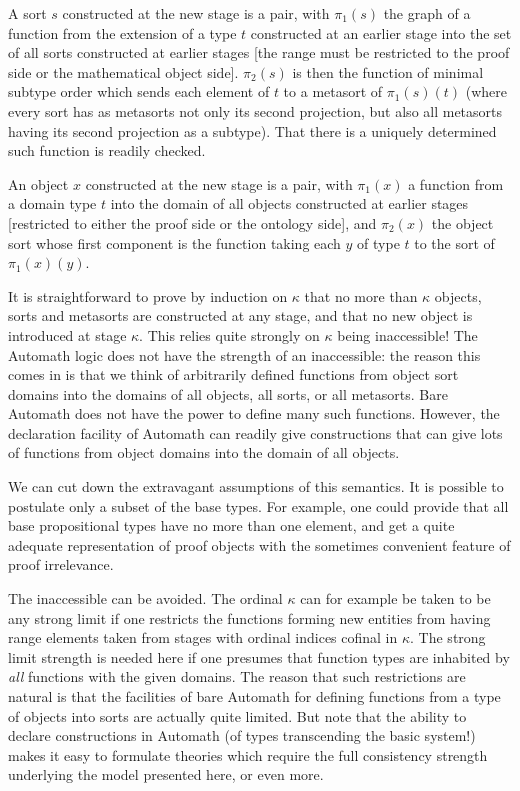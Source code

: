 \documentclass[12pt]{article}
\begin{document}
A sort $s$ constructed at the new stage is a pair, with $\pi_1(s)$ the graph of a function from the extension of a type $t$ constructed at an earlier stage into the set of all sorts constructed at earlier stages [the range must be restricted to the proof side or the mathematical object side].  $\pi_2(s)$ is then the function of minimal subtype order which sends each element of $t$ to a metasort of $\pi_1(s)(t)$ (where every sort has as metasorts not only
its second projection, but also all metasorts having its second projection as a subtype).  That there is a uniquely determined such function is readily checked.

An object $x$ constructed at the new stage is a pair, with $\pi_1(x)$ a function from a domain type $t$ into the domain of all objects constructed at earlier stages [restricted to either the proof side or the ontology side], and $\pi_2(x)$ the object sort whose first component is the function taking each $y$ of type $t$ to the sort of $\pi_1(x)(y)$.

It is straightforward to prove by induction on $\kappa$ that no more than $\kappa$ objects, sorts and metasorts are constructed at any stage, and that no new object is introduced
at stage $\kappa$.  This relies quite strongly on $\kappa$ being inaccessible!  The Automath logic does not have the strength of an inaccessible:  the reason this comes in is that we think of arbitrarily defined functions from object sort domains into the domains of all objects, all sorts, or all metasorts.  Bare Automath does not have the power to define many such functions.  However, the declaration facility of Automath can readily give constructions that can give lots of functions from object domains into the domain of all objects.

We can cut down the extravagant assumptions of this semantics.  It is possible to postulate only a subset of the base types.  For example, one could provide that all base propositional types have no more than one element, and get a quite adequate representation of proof objects with the sometimes convenient feature of proof irrelevance.

The inaccessible can be avoided.  The ordinal $\kappa$ can for example be taken to be any strong limit if one restricts the functions forming new
entities from having range elements taken from stages with ordinal indices cofinal in $\kappa$.  The strong limit strength is needed here if one presumes that function types are inhabited by {\em all\/} functions with the given domains.  The reason that such restrictions are natural is that the facilities of bare Automath for defining functions from a type of objects into sorts are actually quite limited.  But note that the ability to declare constructions in Automath (of types transcending the basic system!) makes it easy to formulate theories which require the full consistency strength underlying the model presented here, or even more.
\end{document}
